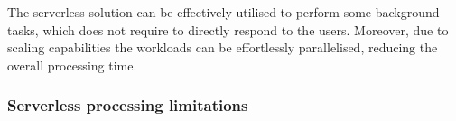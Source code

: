 The serverless solution can be effectively utilised to perform some background tasks, which does not require to directly respond to the users. Moreover, due to scaling capabilities the workloads can be effortlessly parallelised, reducing the overall processing time.







\subsubsection{Serverless processing limitations}

